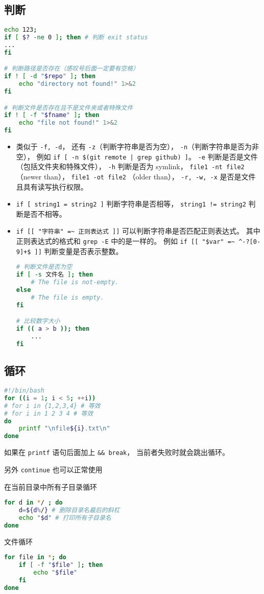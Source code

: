 \subsection{判断}
\begin{lstlisting}[language=bash]
echo 123;
if [ $? -ne 0 ]; then # 判断 exit status
...
fi

# 判断路径是否存在（感叹号后面一定要有空格）
if ! [ -d "$repo" ]; then
    echo "directory not found!" 1>&2
fi

# 判断文件是否存在且不是文件夹或者特殊文件
if ! [ -f "$fname" ]; then
    echo "file not found!" 1>&2
fi
\end{lstlisting}
\begin{itemize}
\item 类似于 \verb|-f, -d|， 还有 \verb|-z|（判断字符串是否为空）， \verb|-n|（判断字符串是否为非空）， 例如 \verb`if [ -n $(git remote | grep github) ]`。  \verb|-e| 判断是否是文件（包括文件夹和特殊文件）， \verb|-h| 判断是否为 symlink， \verb|file1 -nt file2| （newer than）， \verb|file1 -ot file2| （older than）， \verb|-r, -w, -x| 是否是文件且具有读写执行权限。
\item \verb|if [ string1 = string2 ]| 判断字符串是否相等， \verb|string1 != string2| 判断是否不相等。
\item \verb|if [[ "字符串" =~ 正则表达式 ]]| 可以判断字符串是否匹配正则表达式。 其中正则表达式的格式和 \verb|grep -E| 中的是一样的。 例如 \verb|if [[ "$var" =~ ^-?[0-9]+$ ]]| 判断变量是否表示整数。
\begin{lstlisting}[language=bash]
# 判断文件是否为空
if [ -s 文件名 ]; then
    # The file is not-empty.
else
    # The file is empty.
fi

# 比较数字大小
if (( a > b )); then
    ...
fi
\end{lstlisting}
\end{itemize}

\subsection{循环}
\begin{lstlisting}[language=bash]
#!/bin/bash
for ((i = 1; i < 5; ++i))
# for i in {1,2,3,4} # 等效
# for i in 1 2 3 4 # 等效
do
	printf "\nfile${i}.txt\n"
done
\end{lstlisting}
如果在 \verb|printf| 语句后面加上 \verb|&& break|， 当前者失败时就会跳出循环。

另外 \verb`continue` 也可以正常使用

在当前目录中所有子目录循环
\begin{lstlisting}[language=bash]
for d in */ ; do
    d=${d%/} # 删除目录名最后的斜杠
    echo "$d" # 打印所有子目录名
done
\end{lstlisting}
文件循环
\begin{lstlisting}[language=bash]
for file in *; do
    if [ -f "$file" ]; then
        echo "$file"
    fi
done
\end{lstlisting}

